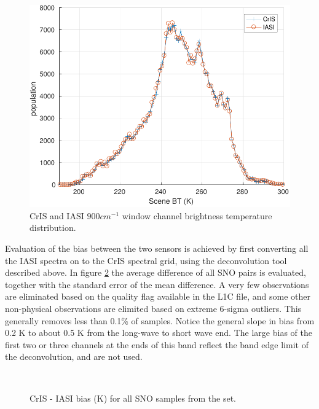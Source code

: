 \documentclass[11pt]{article}
\begin{document}
\begin{figure}[htb]
\centering
\includegraphics[width=.6\linewidth]{./figs/IC_jplSNO_900wn_hist_vs_scene.pdf}
\caption{\label{fig:orgparagraph4}
  CrIS and IASI $900 cm^{-1}$ window channel brightness temperature distribution.}
\label{fig:X2}
\end{figure}

Evaluation of the bias between the two sensors is achieved by first converting all the
IASI spectra on to the CrIS spectral grid, using the deconvolution tool described above.
In figure \ref{fig:X3} the average difference of all SNO pairs
is evaluated, together with the standard error of the mean difference. A very few
observations are eliminated based on the quality flag available in the L1C file, and some other non-physical observations are elimited based on extreme 6-sigma outliers. This generally removes less than  0.1\%  of samples. Notice the general slope in bias from 0.2 K to about 0.5 K from the long-wave to short wave end. The large bias of the first two or three channels at the ends of this band reflect the band edge limit of the deconvolution, and are not used.

\begin{figure}[htb]
  \centering
  \,
  \caption{CrIS - IASI bias (K) for all SNO samples from the set.}
  \label{fig:X3}
\end{figure}
\end{document}
